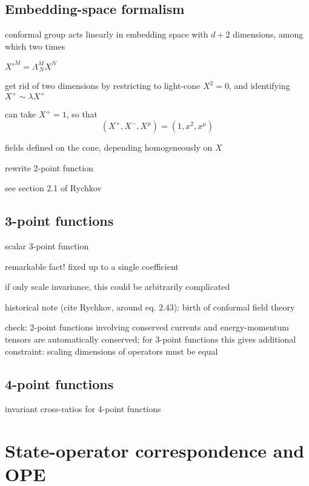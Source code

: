 \documentclass[a4paper,12pt]{article}
\numberwithin{equation}{section}
\begin{document}
\subsection{Embedding-space formalism}

conformal group acts linearly in embedding space with $d+2$ dimensions, among which two times

$X'^M = \Lambda^M_{~N} X^N$

get rid of two dimensions by restricting to light-cone $X^2 = 0$, and identifying $X^+ \sim \lambda X^+$


can take $X^+ = 1$, so that
\begin{equation}
	(X^+, X^-, X^\mu) = (1, x^2, x^\mu)
\end{equation}


fields defined on the cone, depending homogeneously on $X$

rewrite 2-point function


see section 2.1 of Rychkov

\subsection{3-point functions}

scalar 3-point function

remarkable fact! fixed up to a single coefficient

if only scale invariance, this could be arbitrarily complicated

historical note (cite Rychkov, around eq. 2.43): birth of conformal field theory


check: 2-point functions involving conserved currents and energy-momentum tensors are automatically conserved; for 3-point functions this gives additional constraint: scaling dimensions of operators must be equal



\subsection{4-point functions}

invariant cross-ratios for 4-point functions


\section{State-operator correspondence and OPE}
\end{document}
